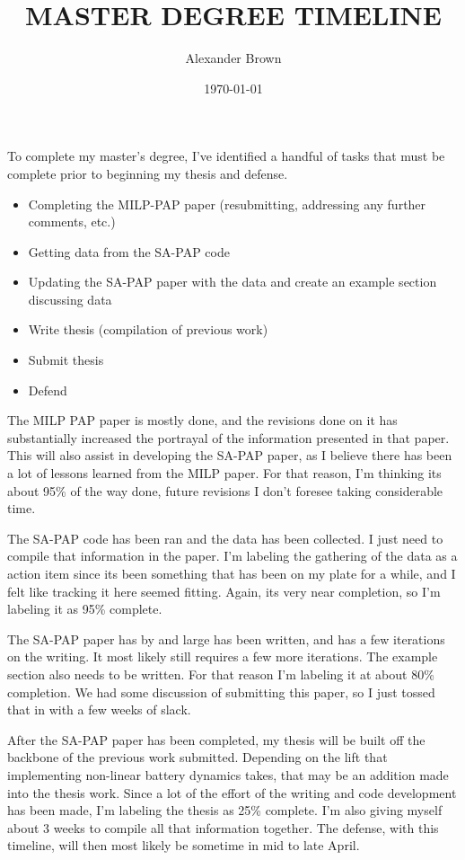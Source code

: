 \documentclass[11pt,a4paper,final]{article}
\author{Alexander Brown}
\date{\today}
\title{MASTER DEGREE TIMELINE}
\begin{document}
\maketitle
To complete my master's degree, I've identified a handful of tasks that must be complete prior to beginning my thesis and defense.

\begin{itemize}
\item Completing the MILP-PAP paper (resubmitting, addressing any further comments, etc.)
\item Getting data from the SA-PAP code
\item Updating the SA-PAP paper with the data and create an example section discussing data
\item Write thesis (compilation of previous work)
\item Submit thesis
\item Defend
\end{itemize}


The MILP PAP paper is mostly done, and the revisions done on it has substantially increased the portrayal of the information presented in that paper. This will also assist in developing the SA-PAP paper, as I believe there has been a lot of lessons learned from the MILP paper. For that reason, I'm thinking its about 95\% of the way done, future revisions I don't foresee taking considerable time.

The SA-PAP code has been ran and the data has been collected. I just need to compile that information in the paper. I'm labeling the gathering of the data as a action item since its been something that has been on my plate for a while, and I felt like tracking it here seemed fitting. Again, its very near completion, so I'm labeling it as 95\% complete.

The SA-PAP paper has by and large has been written, and has a few iterations on the writing. It most likely still requires a few more iterations. The example section also needs to be written. For that reason I'm labeling it at about 80\% completion. We had some discussion of submitting this paper, so I just tossed that in with a few weeks of slack.

After the SA-PAP paper has been completed, my thesis will be built off the backbone of the previous work submitted. Depending on the lift that implementing non-linear battery dynamics takes, that may be an addition made into the thesis work. Since a lot of the effort of the writing and code development has been made, I'm labeling the thesis as 25\% complete. I'm also giving myself about 3 weeks to compile all that information together. The defense, with this timeline, will then most likely be sometime in mid to late April.
\end{document}
